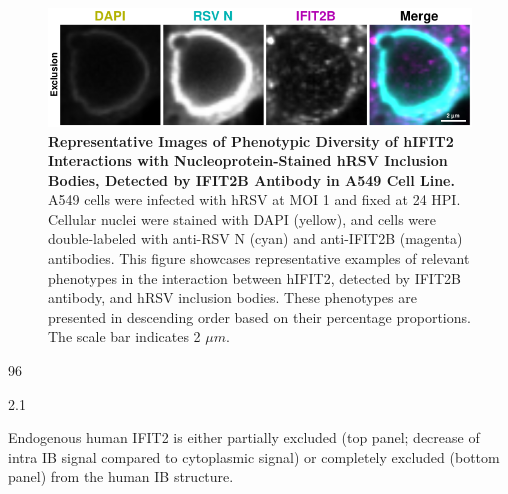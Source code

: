 \begin{figure}
    \centering
    \includegraphics[width=1\linewidth]{08. Chapter 3/Figs/02. Infection/02. IFIT2/02. IFIT2B/03. i2b a549 hrsv n.pdf} 
    \caption[Representative Images of Phenotypic Diversity of hIFIT2 Interactions with Nucleoprotein-Stained hRSV Inclusion Bodies, Detected by IFIT2B Antibody in A549 Cell Line.]{\textbf{Representative Images of Phenotypic Diversity of hIFIT2 Interactions with Nucleoprotein-Stained hRSV Inclusion Bodies, Detected by IFIT2B Antibody in A549 Cell Line.} A549 cells were infected with hRSV at MOI 1 and fixed at 24 HPI. Cellular nuclei were stained with DAPI (yellow), and cells were double-labeled with anti-RSV N (cyan) and anti-IFIT2B (magenta) antibodies. This figure showcases representative examples of relevant phenotypes in the interaction between hIFIT2, detected by IFIT2B antibody, and hRSV inclusion bodies. These phenotypes are presented in descending order based on their percentage proportions. The scale bar indicates 2 \(\mu m\).}
    \label{fig:Representative Images of Phenotypic Diversity of hIFIT2 Interactions with Nucleoprotein-Stained hRSV Inclusion Bodies, Detected by IFIT2B Antibody in A549 Cell Line}
\end{figure}

96

2.1

Endogenous human IFIT2 is either partially excluded (top panel; decrease of intra IB signal compared to cytoplasmic signal) or completely excluded (bottom panel) from the human IB structure.

